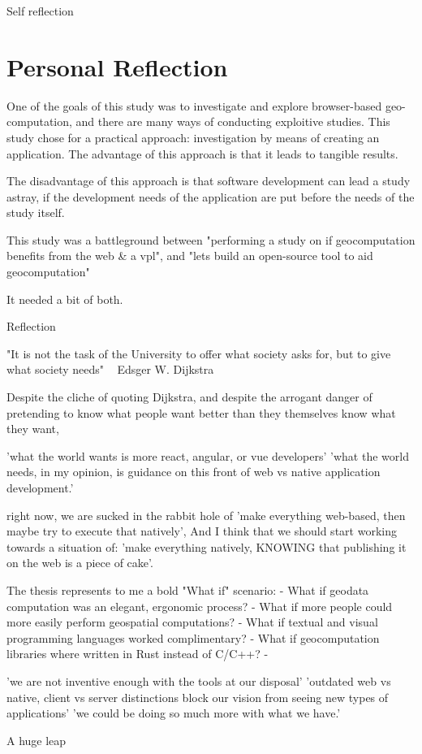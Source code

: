 Self reflection 


\section{Personal Reflection}


One of the goals of this study was to investigate and explore browser-based geo-computation, and there are many ways of conducting exploitive studies. 
This study chose for a practical approach: investigation by means of creating an application.
The advantage of this approach is that it leads to tangible results. 

The disadvantage of this approach is that software development can lead a study astray, if the development needs of the application are put before the needs of the study itself.

This study was a battleground between "performing a study on if geocomputation benefits from the web \& a vpl", and "lets build an open-source tool to aid geocomputation"

It needed a bit of both.




\begin{note}
  
  Reflection
  
  "It is not the task of the University to offer what society asks for, but to give what society needs" ~ Edsger W. Dijkstra
  
  Despite the cliche of quoting Dijkstra, and despite the arrogant danger of pretending to know what people want better than they themselves know what they want, 
  
  
  'what the world wants is more react, angular, or vue developers'
  'what the world needs, in my opinion, is guidance on this front of web vs native application development.'
  
  right now, we are sucked in the rabbit hole of 'make everything web-based, then maybe try to execute that natively',
  And I think that we should start working towards a situation of: 'make everything natively, KNOWING that publishing it on the web is a piece of cake'.
  
  
  
  The thesis represents to me a bold "What if" scenario: 
  - What if geodata computation was an elegant, ergonomic process?
  - What if more people could more easily perform geospatial computations?
  - What if textual and visual programming languages worked complimentary?    
  - What if geocomputation libraries where written in Rust instead of C/C++?
  - 
  
  'we are not inventive enough with the tools at our disposal'
  'outdated web vs native, client vs server distinctions block our vision from seeing new types of applications'
  'we could be doing so much more with what we have.'
  
  
  A huge leap 
  
  
  \end{note}
  


